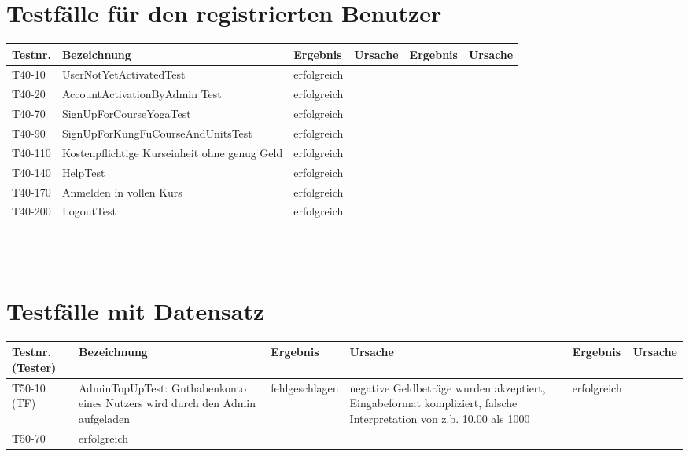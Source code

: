 \begin{landscape}
	\section{Testfälle für den registrierten Benutzer}
		\begin{tabular}{|p{2.0cm} |p{5.0cm}|p{3.0cm}|p{5.0cm}|p{4.0cm}|p{4.0cm}|}
			\hline \textbf{Testnr.} & \textbf{Bezeichnung} & \textbf{Ergebnis} & \textbf{Ursache} & \textbf{Ergebnis} & \textbf{Ursache} \\
			\hline T40-10   &  UserNotYetActivatedTest        & erfolgreich   &        &         &       \\
			\hline T40-20   & AccountActivationByAdmin Test  & erfolgreich    &        &         &       \\	
			\hline T40-70   & SignUpForCourseYogaTest & erfolgreich &        &         &       \\	
			\hline T40-90   & SignUpForKungFuCourseAndUnitsTest & erfolgreich &        &         &       \\	
			\hline T40-110  & Kostenpflichtige Kurseinheit ohne genug Geld & erfolgreich &        &         &       \\	
			\hline T40-140  & HelpTest & erfolgreich &        &         &       \\	
			\hline T40-170  & Anmelden in vollen Kurs & erfolgreich &        &         &       \\	
			\hline T40-200  & LogoutTest & erfolgreich &        &         &       \\
			\hline 
		\end{tabular} \ \\
		\ \\
			
	\section{Testfälle mit Datensatz}	
		\begin{tabular}{|p{2.0cm} |p{5.0cm}|p{3.0cm}|p{5.0cm}|p{4.0cm}|p{4.0cm}|}
			\hline \textbf{Testnr.(Tester)} & \textbf{Bezeichnung} & \textbf{Ergebnis} & \textbf{Ursache} & \textbf{Ergebnis} & \textbf{Ursache} \\
			
			\hline  T50-10 (TF) & AdminTopUpTest: Guthabenkonto eines Nutzers wird durch den Admin aufgeladen &     fehlgeschlagen     & negative Geldbeträge wurden akzeptiert,  Eingabeformat kompliziert, falsche Interpretation von z.b. 10.00 als 1000       &    erfolgreich     &       \\	
			\hline T50-70 & erfolgreich &          &        &         &       \\
			

\end{tabular}
\end{landscape}
